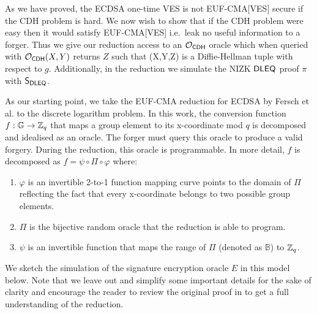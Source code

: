 \documentclass[fullpage]{article}
\theoremstyle{definition}
\newcommand{\EUFCMA}{\textsf{EUF-CMA}\xspace}
\newcommand{\EUFCMAVES}{\textsf{EUF-CMA}[\textsf{VES}]\xspace}
\newcommand{\G}{\mathbb{G}}
\begin{document}
\newcommand{\Ocdh}{\mathcal{O}_{\CDH}}
\newcommand{\betarange}{\mathbb{B}}
\newcommand{\Sdleq}{\pcalgostyle{S}_{\DLEQ}}

\label{proof-ecdsa-eufcma}
As we have proved, the ECDSA one-time VES is not \EUFCMAVES secure if the CDH problem is hard. We now wish to show that if the CDH problem were easy then it would satisfy \EUFCMAVES i.e.\ leak no useful information to a forger. Thus we give our reduction access to an $\Ocdh$ oracle which when queried with $\Ocdh(X,Y)$ returns $Z$ such that (X,Y,Z) is a Diffie-Hellman tuple with respect to $g$. Additionally, in the reduction we simulate the NIZK $\textsf{DLEQ}$ proof $\pi$ with $\Sdleq$.

As our starting point, we take the \EUFCMA reduction for ECDSA by Fersch et al.\cite{ecdsa-eufcma} to the discrete logarithm problem. In this work, the conversion function $f:\G \rightarrow \ZZ_q$ that maps a group element to its x-coordinate mod $q$ is decomposed and idealised as an oracle. The forger must query this oracle to produce a valid forgery. During the reduction, this oracle is programmable. In more detail, $f$ is decomposed as $f = \psi \circ \Pi \circ \varphi$ where:

\begin{enumerate}
    \item $\varphi$ is an invertible 2-to-1 function mapping curve points to the domain of $\Pi$ reflecting the fact that every x-coordinate belongs to two possible group elements.
    \item $\Pi$ is the bijective random oracle that the reduction is able to program.
    \item $\psi$ is an invertible function that maps the range of $\Pi$ (denoted as $\betarange$)  to $\mathbb{Z}_q$.
\end{enumerate}

We sketch the simulation of the signature encryption oracle $E$ in this model below. Note that we leave out and simplify some important details for the sake of clarity and encourage the reader to review the original proof in \cite{ecdsa-eufcma} to get a full understanding of the reduction.
\end{document}
